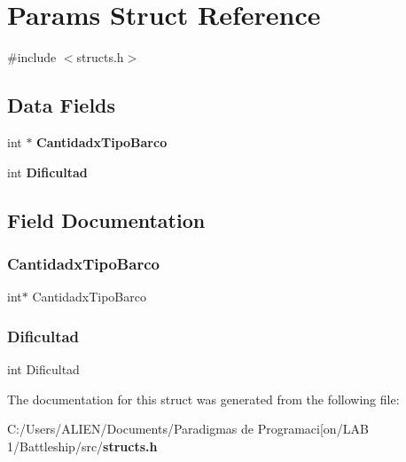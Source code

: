 \section{Params Struct Reference}
\label{struct_params}


{\ttfamily \#include $<$structs.\+h$>$}

\subsection*{Data Fields}
\begin{DoxyCompactItemize}
\item 
int $\ast$ {\bf Cantidadx\+Tipo\+Barco}
\item 
int {\bf Dificultad}
\end{DoxyCompactItemize}


\subsection{Field Documentation}
\label{struct_params_a2018f305df5539257f296f8cabf55ffa} 
\subsubsection{Cantidadx\+Tipo\+Barco}
{\footnotesize\ttfamily int$\ast$ Cantidadx\+Tipo\+Barco}

\label{struct_params_a33e91e208e69c833cb1f04c86f371337} 
\subsubsection{Dificultad}
{\footnotesize\ttfamily int Dificultad}



The documentation for this struct was generated from the following file\+:\begin{DoxyCompactItemize}
\item 
C\+:/\+Users/\+A\+L\+I\+E\+N/\+Documents/\+Paradigmas de Programaci[on/\+L\+A\+B 1/\+Battleship/src/{\bf structs.\+h}\end{DoxyCompactItemize}
